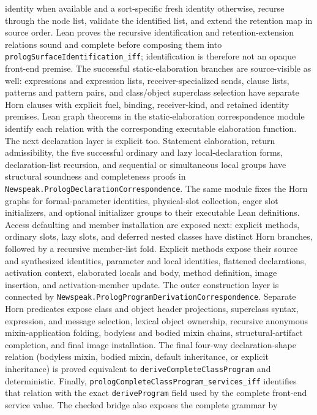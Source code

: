\documentclass[11pt]{article}
\numberwithin{equation}{section}
\begin{document}
identity when available and a sort-specific fresh identity otherwise, recurse
through the node list, validate the identified list, and extend the retention
map in source order.  Lean proves the recursive identification and
retention-extension relations sound and complete before composing them into
\texttt{prologSurfaceIdentification\_iff}; identification is therefore not an
opaque front-end premise.
The successful static-elaboration branches are source-visible as well:
expressions and expression lists, receiver-specialized sends, clause lists,
patterns and pattern pairs, and class/object superclass selection have
separate Horn clauses with explicit fuel, binding, receiver-kind, and retained
identity premises.  Lean graph theorems in the static-elaboration
correspondence module identify each relation with the corresponding executable
elaboration function.
The next declaration layer is explicit too.  Statement elaboration, return
admissibility, the five successful ordinary and lazy local-declaration forms,
declaration-list recursion, and sequential or simultaneous local groups have
structural soundness and completeness proofs in
\texttt{Newspeak.PrologDeclarationCorrespondence}.  The same module fixes the
Horn graphs for formal-parameter identities, physical-slot collection, eager
slot initializers, and optional initializer groups to their executable Lean
definitions.  Access defaulting and member installation are exposed next:
explicit methods, ordinary slots, lazy slots, and deferred nested classes have
distinct Horn branches, followed by a recursive member-list fold.  Explicit
methods expose their source and synthesized identities, parameter and local
identities, flattened declarations, activation context, elaborated locals and
body, method definition, image insertion, and activation-member update.
The outer construction layer is connected by
\texttt{Newspeak.PrologProgramDerivationCorrespondence}.  Separate Horn
predicates expose class and object header projections, superclass syntax,
expression, and message selection, lexical object ownership, recursive
anonymous mixin-application folding, bodyless and bodied mixin chains,
structural-artifact completion, and final image installation.  The final
four-way declaration-shape relation (bodyless mixin, bodied mixin, default
inheritance, or explicit inheritance) is proved equivalent to
\texttt{deriveCompleteClassProgram} and deterministic.  Finally,
\texttt{prologCompleteClassProgram\_services\_iff} identifies that relation
with the exact \texttt{deriveProgram} field used by the complete front-end
service value.  The checked bridge also exposes the complete grammar by
\end{document}
